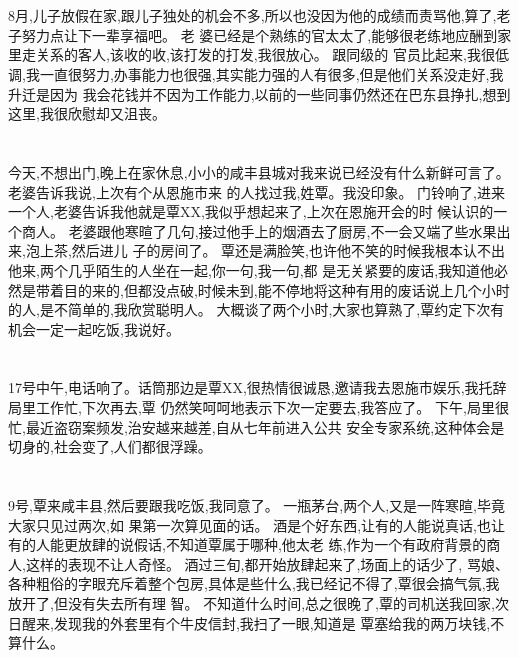 \documentclass[11pt]{article}
\begin{document}
\section{}
8月,儿子放假在家,跟儿子独处的机会不多,所以也没因为他的成绩而责骂他,算了,老子努力点让下一辈享福吧。 老
婆已经是个熟练的官太太了,能够很老练地应酬到家里走关系的客人,该收的收,该打发的打发,我很放心。 跟同级的
官员比起来,我很低调,我一直很努力,办事能力也很强,其实能力强的人有很多,但是他们关系没走好,我升迁是因为
我会花钱并不因为工作能力,以前的一些同事仍然还在巴东县挣扎,想到这里,我很欣慰却又沮丧。

\section{}
今天,不想出门,晚上在家休息,小小的咸丰县城对我来说已经没有什么新鲜可言了。 老婆告诉我说,上次有个从恩施市来
的人找过我,姓覃。我没印象。 门铃响了,进来一个人,老婆告诉我他就是覃XX,我似乎想起来了,上次在恩施开会的时
候认识的一个商人。 老婆跟他寒暄了几句,接过他手上的烟酒去了厨房,不一会又端了些水果出来,泡上茶,然后进儿
子的房间了。 覃还是满脸笑,也许他不笑的时候我根本认不出他来,两个几乎陌生的人坐在一起,你一句,我一句,都
是无关紧要的废话,我知道他必然是带着目的来的,但都没点破,时候未到,能不停地将这种有用的废话说上几个小时
的人,是不简单的,我欣赏聪明人。 大概谈了两个小时,大家也算熟了,覃约定下次有机会一定一起吃饭,我说好。

\section{}
17号中午,电话响了。话筒那边是覃XX,很热情很诚恳,邀请我去恩施市娱乐,我托辞局里工作忙,下次再去,覃
仍然笑呵呵地表示下次一定要去,我答应了。 下午,局里很忙,最近盗窃案频发,治安越来越差,自从七年前进入公共
安全专家系统,这种体会是切身的,社会变了,人们都很浮躁。

\section{}
9号,覃来咸丰县,然后要跟我吃饭,我同意了。 一瓶茅台,两个人,又是一阵寒暄,毕竟大家只见过两次,如
果第一次算见面的话。 酒是个好东西,让有的人能说真话,也让有的人能更放肆的说假话,不知道覃属于哪种,他太老
练,作为一个有政府背景的商人,这样的表现不让人奇怪。 酒过三旬,都开始放肆起来了,场面上的话少了,
骂娘、各种粗俗的字眼充斥着整个包房,具体是些什么,我已经记不得了,覃很会搞气氛,我放开了,但没有失去所有理
智。 不知道什么时间,总之很晚了,覃的司机送我回家,次日醒来,发现我的外套里有个牛皮信封,我扫了一眼,知道是
覃塞给我的两万块钱,不算什么。
\end{document}
